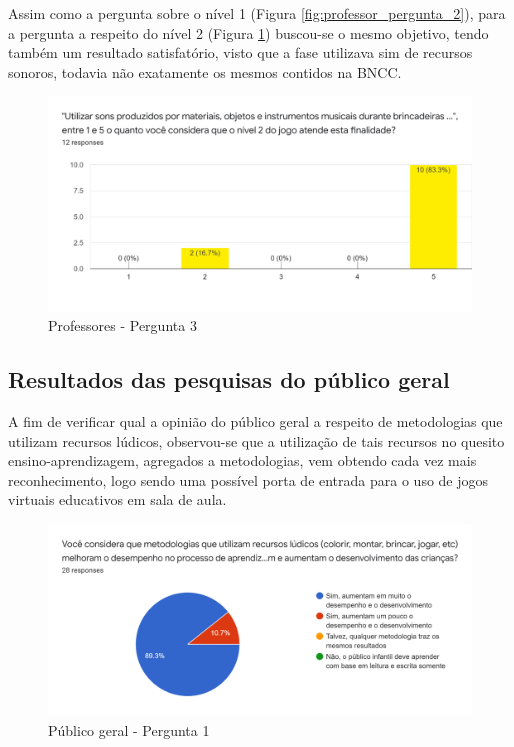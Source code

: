 \documentclass[article,12pt,openany,oneside,a4paper,english,brazil]{abntex2}
\begin{document}
Assim como a pergunta sobre o nível 1 (Figura \ref{fig:professor_pergunta_2}), para a pergunta a respeito do nível 2 (Figura \ref{fig:professor_pergunta_3}) buscou-se o mesmo objetivo, tendo também um resultado satisfatório, visto que a fase utilizava sim de recursos sonoros, todavia não exatamente os mesmos contidos na BNCC.

\begin{figure}[H]
    \centering
    \caption{Professores - Pergunta 3}
    \label{fig:professor_pergunta_3}
    \includegraphics[width=0.8\linewidth]{SearchResults/Teachers/Level2.png}
\end{figure}

\subsection{Resultados das pesquisas do público geral}
\label{sc:resultados_pesquisa_publico}

A fim de verificar qual a opinião do público geral a respeito de metodologias que utilizam recursos lúdicos, observou-se que a utilização de tais recursos no quesito ensino-aprendizagem, agregados a metodologias, vem obtendo cada vez mais reconhecimento, logo sendo uma possível porta de entrada para o uso de jogos virtuais educativos em sala de aula.

\begin{figure}[H]
    \centering
    \caption{Público geral - Pergunta 1}
    \label{fig:aluno_pergunta_1}
    \includegraphics[width=0.8\linewidth]{SearchResults/Students/LudicMetodologies.png}
\end{figure}
\end{document}
